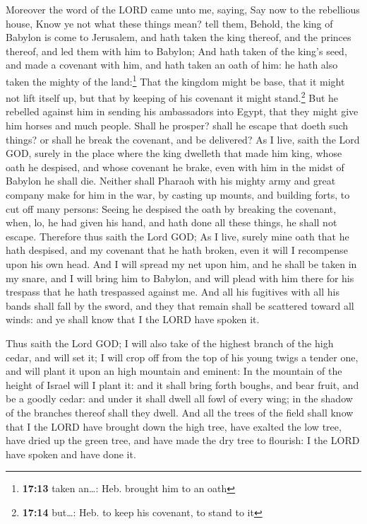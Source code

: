  Moreover the word of the LORD came unto me, saying,
 Say now to the rebellious house, Know ye not what these
things mean? tell them, Behold, the king of Babylon is come to
Jerusalem, and hath taken the king thereof, and the princes thereof, and
led them with him to Babylon;  And hath taken of the
king's seed, and made a covenant with him, and hath taken an oath of
him: he hath also taken the mighty of the land:\footnote{\textbf{17:13}
  taken an\ldots: Heb. brought him to an oath}  That the
kingdom might be base, that it might not lift itself up, but that by
keeping of his covenant it might stand.\footnote{\textbf{17:14}
  but\ldots: Heb. to keep his covenant, to stand to it} 
But he rebelled against him in sending his ambassadors into Egypt, that
they might give him horses and much people. Shall he prosper? shall he
escape that doeth such things? or shall he break the covenant, and be
delivered?  As I live, saith the Lord GOD, surely in the
place where the king dwelleth that made him king, whose oath he
despised, and whose covenant he brake, even with him in the midst of
Babylon he shall die.  Neither shall Pharaoh with his
mighty army and great company make for him in the war, by casting up
mounts, and building forts, to cut off many persons: 
Seeing he despised the oath by breaking the covenant, when, lo, he had
given his hand, and hath done all these things, he shall not escape.
 Therefore thus saith the Lord GOD; As I live, surely
mine oath that he hath despised, and my covenant that he hath broken,
even it will I recompense upon his own head.  And I will
spread my net upon him, and he shall be taken in my snare, and I will
bring him to Babylon, and will plead with him there for his trespass
that he hath trespassed against me.  And all his
fugitives with all his bands shall fall by the sword, and they that
remain shall be scattered toward all winds: and ye shall know that I the
LORD have spoken it.

 Thus saith the Lord GOD; I will also take of the highest
branch of the high cedar, and will set it; I will crop off from the top
of his young twigs a tender one, and will plant it upon an high mountain
and eminent:  In the mountain of the height of Israel
will I plant it: and it shall bring forth boughs, and bear fruit, and be
a goodly cedar: and under it shall dwell all fowl of every wing; in the
shadow of the branches thereof shall they dwell.  And all
the trees of the field shall know that I the LORD have brought down the
high tree, have exalted the low tree, have dried up the green tree, and
have made the dry tree to flourish: I the LORD have spoken and have done
it.

